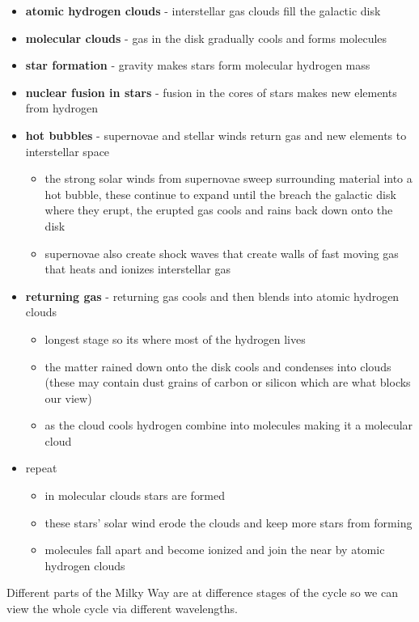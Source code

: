 \begin{itemize}
\item \textbf{atomic hydrogen clouds} - interstellar gas clouds fill the galactic disk
\item \textbf{molecular clouds} - gas in the disk gradually cools and forms molecules
\item \textbf{star formation} - gravity makes stars form molecular hydrogen mass
\item \textbf{nuclear fusion in stars} - fusion in the cores of stars makes new elements from hydrogen
\item \textbf{hot bubbles} - supernovae and stellar winds return gas and new elements to interstellar space
\begin{itemize}
\item the strong solar winds from supernovae sweep surrounding material into a hot bubble, these continue to expand until the breach the galactic disk where they erupt, the erupted gas cools and rains back down onto the disk
\item supernovae also create shock waves that create walls of fast moving gas that heats and ionizes interstellar gas
\end{itemize}
\item \textbf{returning gas} - returning gas cools and then blends into atomic hydrogen clouds
\begin{itemize}
\item longest stage so its where most of the hydrogen lives
\item the matter rained down onto the disk cools and condenses into clouds (these may contain dust grains of carbon or silicon which are what blocks our view)
\item as the cloud cools hydrogen combine into molecules making it a molecular cloud
\end{itemize}
\item repeat
\begin{itemize}
\item in molecular clouds stars are formed
\item these stars' solar wind erode the clouds and keep more stars from forming
\item molecules fall apart and become ionized and join the near by atomic hydrogen clouds
\end{itemize}
\end{itemize}

Different parts of the Milky Way are at difference stages of the cycle so we can view the whole cycle via different wavelengths.

